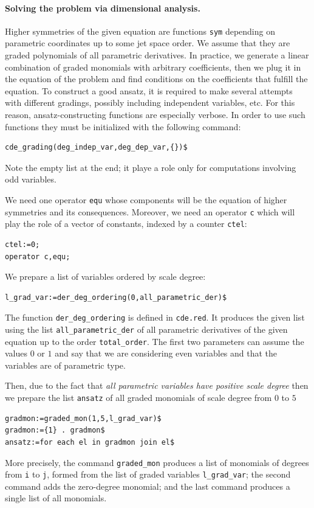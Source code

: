 \paragraph*{Solving the problem via dimensional analysis.}
\label{cdesec:solving-problem-via}
Higher symmetries of the given equation are functions \texttt{sym} depending on
parametric coordinates up to some jet space order. We assume that they are
graded polynomials of all parametric derivatives. In practice, we generate a
linear combination of graded monomials with arbitrary coefficients, then we
plug it in the equation of the problem and find conditions on the coefficients
that fulfill the equation.  To construct a good ansatz, it is required to make
several attempts with different gradings, possibly including independent
variables, etc. For this reason, ansatz-constructing functions are especially
verbose.  In order to use such functions they must be initialized with the
following command:
\hypertarget{operator:CDE_GRADING}{}
\begin{verbatim}
cde_grading(deg_indep_var,deg_dep_var,{})$
\end{verbatim}
Note the empty list at the end; it playe a role only for computations involving
odd variables.

We need one operator \texttt{equ} whose components will be the equation of
higher symmetries and its consequences. Moreover, we need an operator
\texttt{c} which will play the role of a vector of constants, indexed by a
counter \texttt{ctel}:
\begin{verbatim}
ctel:=0;
operator c,equ;
\end{verbatim}
We prepare a list of variables ordered by scale degree:
\hypertarget{operator:DER_DEG_ORDERING}{}
\begin{verbatim}
l_grad_var:=der_deg_ordering(0,all_parametric_der)$
\end{verbatim}
The function \texttt{der\_deg\_ordering} is defined in \texttt{cde.red}. It
produces the given list using the list \texttt{all\_parametric\_der} of all
parametric derivatives of the given equation up to the order
\texttt{total\_order}. The first two parameters can assume the values $0$ or $1$
and say that we are considering even variables and that the variables are of
parametric type.

Then, due to the fact that \emph{all parametric
  variables have positive scale degree} then we prepare the list
\texttt{ansatz} of all graded monomials of scale degree from $0$ to $5$
\begin{verbatim}
gradmon:=graded_mon(1,5,l_grad_var)$
gradmon:={1} . gradmon$
ansatz:=for each el in gradmon join el$
\end{verbatim}
More precisely, the command \texttt{graded\_mon} produces a list of monomials
of degrees from \texttt{i} to \texttt{j}, formed from the list of graded
variables \texttt{l\_grad\_var}; the second command adds the zero-degree
monomial; and the last command produces a single list of all monomials.


